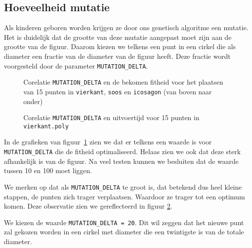 \subsection{Hoeveelheid mutatie}
Als kinderen geboren worden krijgen ze door ons genetisch algoritme een mutatie. Het is duidelijk dat de grootte van deze mutatie aangepast moet zijn aan de grootte van de figuur. Daarom kiezen we telkens een punt in een cirkel die als diameter een fractie van de diameter van de figuur heeft. Deze fractie wordt voorgesteld door de parameter \texttt{MUTATION\_DELTA}.
\begin{figure}[H]
\caption{Corelatie \texttt{MUTATION\_DELTA} en de bekomen fitheid voor het plaatsen van 15 punten in \texttt{vierkant}, \texttt{soos} en \texttt{icosagon} (van boven naar onder)}

\label{graf:mutationDeltaFig}
\end{figure}
\begin{figure}[H]

\caption{Corelatie \texttt{MUTATION\_DELTA} en uitvoertijd voor 15 punten in \texttt{vierkant.poly}}
\label{graf:mutationDeltaTime}
\end{figure}
In de grafieken van figuur~\ref{graf:mutationDeltaFig} zien we dat er telkens een waarde is voor \texttt{MUTATION\_DELTA} die de fitheid optimaliseerd. Helaas zien we ook dat deze sterk afhankelijk is van de figuur. Na veel testen kunnen we besluiten dat de waarde tussen 10 en 100 moet liggen.

We merken op dat als \texttt{MUTATION\_DELTA} te groot is, dat betekend dus heel kleine stappen, de punten zich trager verplaatsen. Waardoor ze trager tot een optimum komen. Deze observatie zien we gereflecteerd in figuur \ref{graf:mutationDeltaTime}.

We kiezen de waarde \texttt{MUTATION\_DELTA = 20}. Dit wil zeggen dat het nieuwe punt zal gekozen worden in een cirkel met diameter die een twintigste is van de totale diameter.

















